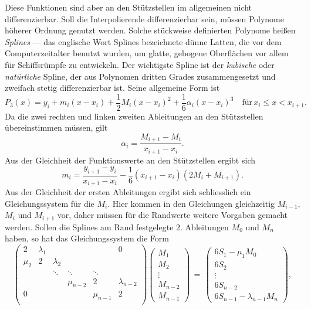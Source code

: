Diese Funktionen sind aber an den Stützstellen im allgemeinen nicht
differenzierbar. Soll die Interpolierende differenzierbar sein, müssen
Polynome höherer Ordnung genutzt werden. Solche stückweise definierten
Polynome heißen \emph{Splines} --- das englische Wort Splines
bezeichnete dünne Latten, die vor dem Computerzeitalter benutzt
wurden, um glatte, gebogene Oberflächen vor allem für Schiffsrümpfe zu
entwickeln. Der wichtigste Spline ist der \emph{kubische} oder
\emph{natürliche}
Spline, der aus
Polynomen dritten Grades zusammengesetzt und zweifach stetig
differenzierbar ist. Seine allgemeine Form ist
\begin{equation}
  P_3(x) = y_i + m_i(x-x_i) + \frac{1}{2}M_i(x-x_i)^2 + \frac{1}{6}\alpha_i(x-x_i)^3
  \quad\text{für}\, x_i \le x < x_{i+1}.
\end{equation}
Da die zwei rechten und linken zweiten Ableitungen an den Stützstellen
übereinstimmen müssen, gilt
\begin{equation}
  \alpha_i = \frac{M_{i+1} - M_i}{x_{i+1} - x_i}.
\end{equation}
Aus der Gleichheit der Funktionswerte an den Stützstellen ergibt sich
\begin{equation}
  m_i = \frac{y_{i+1} - y_i}{x_{i+1}-x_i} -
  \frac{1}{6}(x_{i+1}-x_i)(2M_i + M_{i+1}).
\end{equation}
Aus der Gleichheit der ersten Ableitungen ergibt sich schliesslich ein
Gleichungssystem für die $M_i$. Hier kommen in den Gleichungen
gleichzeitig $M_{i-1}$, $M_i$ und $M_{i+1}$ vor, daher müssen für die
Randwerte weitere Vorgaben gemacht werden. Sollen die Splines am Rand
festgelegte 2. Ableitungen $M_0$ und $M_n$ haben, so hat das
Gleichungssystem die Form
\begin{equation}
  \label{eq:spline1}
  \begin{pmatrix}
    2      & \lambda_1 &           &           &           &         0 \\
    \mu_2  & 2         & \lambda_2 \\
           &           & \ddots    & \ddots    & \ddots \\
           &           &           & \mu_{n-2}  & 2         & \lambda_{n-2} \\
    0      &           &           &           & \mu_{n-1}  & 2         \\
  \end{pmatrix}
  \begin{pmatrix}
    M_1\\
    M_2\\
    \vdots\\
    M_{n-2}\\
    M_{n-1}
  \end{pmatrix} \,=\,
  \begin{pmatrix}
    6S_1 - \mu_1 M_0\\
    6S_2\\
    \vdots\\
    6S_{n-2} \\
    6S_{n-1} -  \lambda_{n-1} M_n
  \end{pmatrix},
\end{equation}
